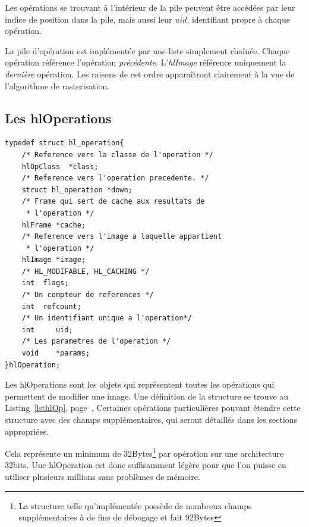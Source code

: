 			Les opérations se trouvant à l'intérieur de la pile peuvent être accédées par leur indice de position dans la pile, mais aussi leur
			$uid$, identifiant propre à chaque opération. 

			La pile d'opération est implémentée par une liste simplement chaînée. Chaque opération référence l'opération \emph{précédente}.
			L'\emph{hlImage} référence uniquement la \emph{dernière} opération. Les raisons de cet ordre apparaîtront clairement à la vue
			de l'algorithme de rasterisation.

		\subsection{Les hlOperations}
		\begin{lstlisting}[float,caption={Définition des hlOperations },frame=tb,label=lsthlOp]
typedef struct hl_operation{
	/* Reference vers la classe de l'operation */
	hlOpClass  *class;	
	/* Reference vers l'operation precedente. */
	struct hl_operation *down;
	/* Frame qui sert de cache aux resultats de 
	 * l'operation */
	hlFrame *cache;			
	/* Reference vers l'image a laquelle appartient 
	 * l'operation */
	hlImage *image;			
	/* HL_MODIFABLE, HL_CACHING */
	int	 flags;			
	/* Un compteur de references */
	int	 refcount;		
	/* Un identifiant unique a l'operation*/
	int 	uid;
	/* Les parametres de l'operation */
	void	*params;		
}hlOperation;
		\end{lstlisting}

		Les hlOperations sont les objets qui représentent toutes les opérations qui permettent de modifier une image. Une définition de la structure
		se trouve au Listing~\ref{lsthlOp}, page~\pageref{lsthlOp}. Certaines opérations particulières pouvant étendre cette structure avec des
		champs supplémentaires, qui seront détaillés dans les sections appropriées.

		Cela représente un minimum de 32Bytes\footnote{La structure telle qu'implémentée possède de nombreux champs supplémentaires à de fins de débogage et fait
		92Bytes} par opération sur une architecture 32bits. Une hlOperation est donc suffisamment légère pour
		que l'on puisse en utiliser plusieurs millions sans problèmes de mémoire. 

